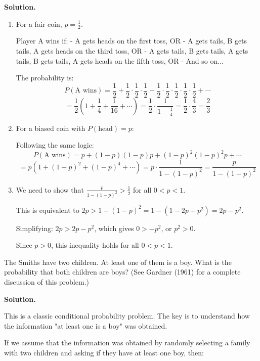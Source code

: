 \noindent\textbf{Solution.}
\begin{enumerate}[label=(\alph*)]
    \item For a fair coin, $p = \frac{1}{2}$.
    
    Player A wins if:
    - A gets heads on the first toss, OR
    - A gets tails, B gets tails, A gets heads on the third toss, OR
    - A gets tails, B gets tails, A gets tails, B gets tails, A gets heads on the fifth toss, OR
    - And so on...
    
    The probability is:
    \[ P(\text{A wins}) = \frac{1}{2} + \frac{1}{2} \cdot \frac{1}{2} \cdot \frac{1}{2} + \frac{1}{2} \cdot \frac{1}{2} \cdot \frac{1}{2} \cdot \frac{1}{2} \cdot \frac{1}{2} + \cdots \]
    \[ = \frac{1}{2} \left(1 + \frac{1}{4} + \frac{1}{16} + \cdots\right) = \frac{1}{2} \cdot \frac{1}{1 - \frac{1}{4}} = \frac{1}{2} \cdot \frac{4}{3} = \frac{2}{3} \]
    
    \item For a biased coin with $P(\text{head}) = p$:
    
    Following the same logic:
    \[ P(\text{A wins}) = p + (1-p)(1-p)p + (1-p)^2(1-p)^2p + \cdots \]
    \[ = p \left(1 + (1-p)^2 + (1-p)^4 + \cdots\right) = p \cdot \frac{1}{1 - (1-p)^2} = \frac{p}{1 - (1-p)^2} \]
    
    \item We need to show that $\frac{p}{1 - (1-p)^2} > \frac{1}{2}$ for all $0 < p < 1$.
    
    This is equivalent to $2p > 1 - (1-p)^2 = 1 - (1 - 2p + p^2) = 2p - p^2$.
    
    Simplifying: $2p > 2p - p^2$, which gives $0 > -p^2$, or $p^2 > 0$.
    
    Since $p > 0$, this inequality holds for all $0 < p < 1$.
\end{enumerate}


\begin{problembox}
The Smiths have two children. At least one of them is a boy. What is the probability that both children are boys? (See Gardner (1961) for a complete discussion of this problem.)
\end{problembox}

\noindent\textbf{Solution.}

This is a classic conditional probability problem. The key is to understand how the information "at least one is a boy" was obtained.

If we assume that the information was obtained by randomly selecting a family with two children and asking if they have at least one boy, then:


